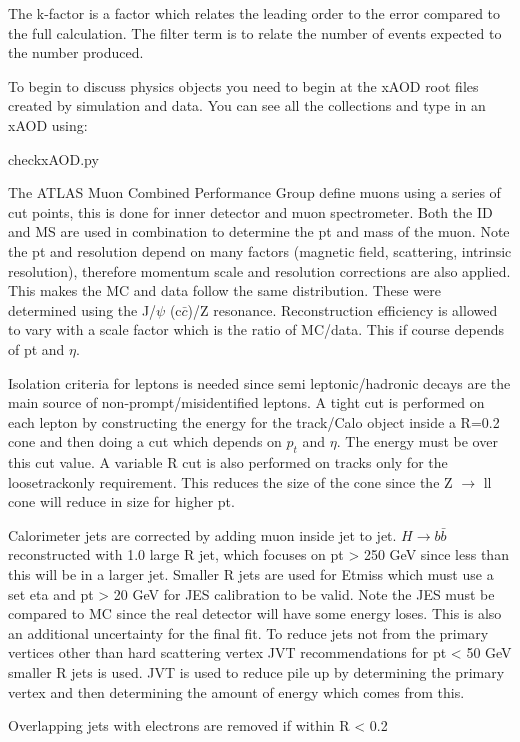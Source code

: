 \documentclass[idxtotoc,hyperref,openany]{labbook} %
\begin{document}
The k-factor is a factor which relates the leading order to the error compared to the full calculation. The filter term is to relate the number of events expected to the number produced. 

To begin to discuss physics objects you need to begin at the xAOD root files created by simulation and data. You can see all the collections and type in an xAOD using:

checkxAOD.py 


The ATLAS Muon Combined Performance Group define muons using a series of cut points, this is done for inner detector and muon spectrometer. Both the ID and MS are used in combination to determine the pt and mass of the muon. Note the pt and resolution depend on many factors (magnetic field, scattering, intrinsic resolution), therefore momentum scale and resolution corrections are also applied. This makes the MC and data follow the same distribution. These were determined using the J/$\psi$ (c$\bar{c}$)/Z resonance.  Reconstruction efficiency is allowed to vary with a scale factor which is the ratio of MC/data. This if course depends of pt and $\eta$. 

Isolation criteria for leptons is needed since semi leptonic/hadronic decays are the main source of non-prompt/misidentified leptons. A tight cut is performed on each lepton by constructing the energy for the track/Calo object inside a R=0.2 cone and then doing a cut which depends on $p_t$ and $\eta$. The energy must be over this cut value. A variable R cut is also performed on tracks only for the loosetrackonly requirement. This reduces the size of the cone since the Z $\rightarrow$  ll cone will reduce in size for higher pt.   


Calorimeter jets are corrected by adding muon inside jet to jet. $H \rightarrow b \bar{b}$ reconstructed with 1.0 large R jet, which focuses on pt > 250 GeV since less than this will be in a larger jet. Smaller R jets are used for Etmiss which must use a set eta and pt > 20 GeV for JES calibration to be valid. Note the JES must be compared to MC since the real detector will have some energy loses. This is also an additional uncertainty for the final fit.  To reduce jets not from the primary vertices other than hard scattering vertex JVT recommendations for pt < 50 GeV smaller R jets is used.  JVT is used to reduce pile up by determining the primary vertex and then determining the amount of energy which comes from this. 

Overlapping jets with electrons are removed if within R < 0.2 
\end{document}
